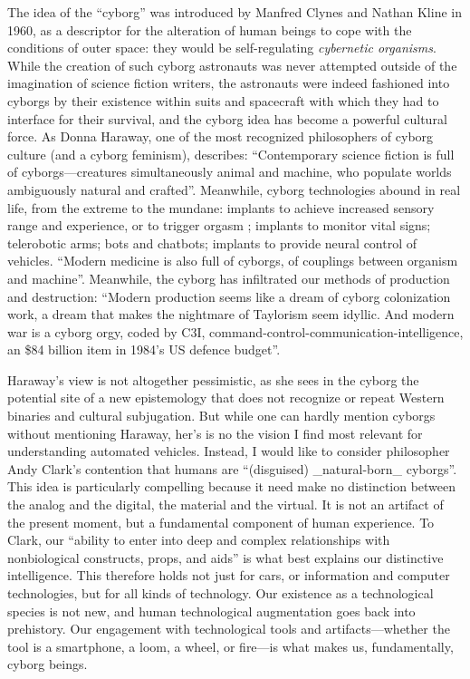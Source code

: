 The idea of the ``cyborg'' was introduced by Manfred Clynes and Nathan
Kline in 1960, as a descriptor for the alteration of human beings to
cope with the conditions of outer space: they would be self-regulating
\emph{cybernetic organisms}\cite[p. 66]{ekbia}. While the creation of
such cyborg astronauts was never attempted outside of the imagination
of science fiction writers, the astronauts were indeed fashioned into
cyborgs by their existence within suits and spacecraft with which they
had to interface for their survival, and the cyborg idea has become a
powerful cultural force. As Donna Haraway, one of the most recognized
philosophers of cyborg culture (and a cyborg feminism), describes:
``Contemporary science 
fiction is full of cyborgs---creatures simultaneously
animal and machine, who populate worlds ambiguously natural and
crafted''\cite[p. 117]{???-haraway}. Meanwhile, cyborg technologies
abound in real life, from the extreme to the mundane: implants to
achieve increased sensory range and experience, or to trigger orgasm
\cite[p. 64]{ekbia}; implants to monitor vital signs; telerobotic
arms; bots and chatbots; implants to provide neural control of
vehicles\cite[p. 65]{ekbia}. ``Modern medicine is also full of
cyborgs, of couplings between organism
and machine''\cite[p. 117]{???-haraway}. Meanwhile, the cyborg has
infiltrated our methods of production and destruction: ``Modern
production seems like a dream of cyborg colonization work, a dream
that makes the nightmare of Taylorism seem idyllic. And modern war is
a cyborg orgy, coded by C3I,
command-control-communication-intelligence, an \$84 billion item in 1984's US
defence budget''\cite[p. 118]{???-haraway}. 

Haraway's view is not altogether pessimistic, as she sees in the cyborg
the potential site of a new epistemology that does not recognize or
repeat Western binaries and cultural subjugation\cite[p.
  118-121]{???-haraway}. But while one can hardly mention cyborgs without
mentioning Haraway, her's is no the vision I find most relevant for
understanding automated vehicles. Instead, I would like to consider philosopher Andy
Clark's contention that humans are ``(disguised) _natural-born_
cyborgs''\cite[p. 66]{ekbia}. This idea is particularly compelling
because it need make no distinction between the analog and the
digital, the material and the virtual. It is not an artifact of the
present moment, but a fundamental component of human experience. To
Clark, our ``ability to enter into deep and complex relationships with
nonbiological constructs, props, and aids'' is what best explains our
distinctive intelligence\cite[p. 66-67]{ekbia}. This therefore holds
not just for cars, or information and computer technologies, but for
all kinds of technology. Our existence as a technological species is
not new, and human technological augmentation goes back into
prehistory. Our engagement with technological tools and
artifacts---whether the tool is a smartphone, a loom, a wheel, or
fire---is what makes us, fundamentally, cyborg beings. 

